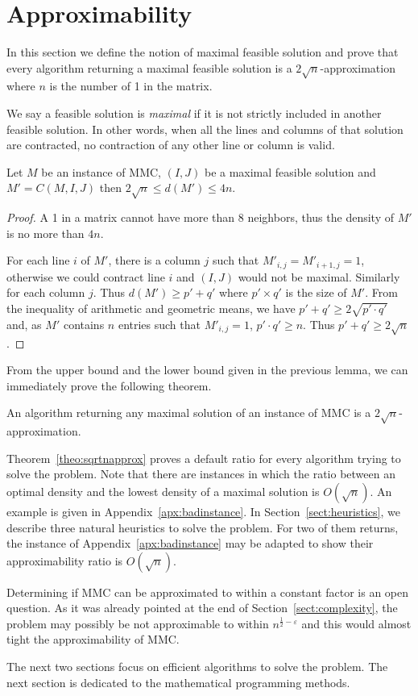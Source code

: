 \section{Approximability}
\label{sect:approx}

In this section we define the notion of maximal feasible solution and prove that every algorithm returning a maximal feasible solution is a $2\sqrt{n}$-approximation where $n$ is the number of 1 in the matrix.

\begin{definition}
We say a feasible solution is \emph{maximal} if it is not strictly included in another feasible solution. In other words, when all the lines and columns of that solution are contracted, no contraction of any other line or column is valid.
\end{definition}

\begin{lemma}
\label{lem:bounds}
Let $M$ be an instance of MMC, $(I,J)$ be a maximal feasible solution and $M' = C(M,I,J)$ then $2 \sqrt{n} \leq d(M') \leq 4n$.
\end{lemma}
\begin{proof}
A 1 in a matrix cannot have more than $8$ neighbors, thus the density of $M'$ is no more than $4n$.

For each line $i$ of $M'$, there is a column $j$ such that $M'_{i,j} = M'_{i+1,j} = 1$, otherwise we could contract line $i$ and $(I,J)$ would not be maximal. Similarly for each column $j$. Thus $d(M') \geq p'+q'$ where $p' \times q'$ is the size of $M'$. From the inequality of arithmetic and geometric means, we have $p' + q ' \geq 2 \sqrt{p'\cdot q'}$ and, as $M'$ contains $n$ entries such that $M'_{i,j} = 1$, $p'\cdot q' \geq n$. Thus $p' + q ' \geq 2 \sqrt{n}$.
\end{proof}

From the upper bound and the lower bound given in the previous lemma, we can immediately prove the following theorem. 

\begin{theorem}
	\label{theo:sqrtnapprox}
An algorithm returning any maximal solution of an instance of MMC is a $2\sqrt{n}$-approximation.
\end{theorem}

Theorem~\ref{theo:sqrtnapprox} proves a default ratio for every algorithm trying to solve the problem. Note that there are instances in which the ratio between an optimal density and the lowest density of a maximal solution is $O(\sqrt{n})$. An example is given in Appendix~\ref{apx:badinstance}. In Section~\ref{sect:heuristics}, we describe three natural heuristics to solve the problem. For two of them returns, the instance of Appendix~\ref{apx:badinstance} may be adapted to show their approximability ratio is $O(\sqrt{n})$. 

Determining if MMC can be approximated to within a constant factor is an open question. As it was already pointed at the end of Section~\ref{sect:complexity}, the problem may possibly be not approximable to within $n^{\frac{1}{2}-\varepsilon}$ and this would almost tight the approximability of MMC.

The next two sections focus on efficient algorithms to solve the problem. The next section is dedicated to the mathematical programming methods.